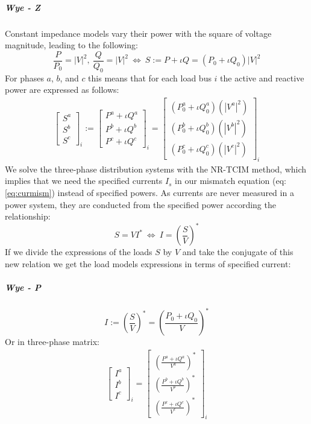 \documentclass[10pt,journal]{article}
\begin{document}
\subparagraph{Wye - Z}
Constant impedance models vary their power with the square of voltage magnitude, leading to the following: 
\begin{equation}
    \frac{P}{P_0}=|V|^2,\ \frac{Q}{Q_0}=|V|^2\ \Leftrightarrow\ S := P +\iota Q = (P_0 + \iota Q_0)|V|^2
\end{equation}
For phases $a$, $b$, and $c$ this means that for each load bus $i$ the active and reactive power are expressed as follows: 
\begin{align}
    \begin{bmatrix}
    S^a\\
    S^b\\
    S^c
    \end{bmatrix}_i := \begin{bmatrix}
    P^a +\iota Q^a\\
    P^b +\iota Q^b\\
    P^c +\iota Q^c
    \end{bmatrix}_i = \begin{bmatrix}
    (P^a_0 +\iota Q^a_0)(|V^a|^2)\\
    (P^b_0 +\iota Q^b_0)(|V^b|^2)\\
    (P^c_0 +\iota Q^c_0)(|V^c|^2)
    \end{bmatrix}_i 
\end{align}
We solve the three-phase distribution systems with the NR-TCIM method, which implies that we need the specified currents $I_s$ in our mismatch equation (eq: \ref{eq:curmism}) instead of specified powers. As currents are never measured in a power system, they are conducted from the specified power according the relationship: 
\begin{equation}
    S=VI^*\ \Leftrightarrow\ I = (\frac{S}{V})^*
\end{equation}
If we divide the expressions of the loads $S$ by $V$ and take the conjugate of this new relation we get the load models expressions in terms of specified current:
\subparagraph{Wye - P }
\begin{equation}
    I := (\frac{S}{V})^* = (\frac{P_0+\iota Q_0}{V})^*
\end{equation}
Or in three-phase matrix: 
\begin{align}
\begin{bmatrix}
    I^a\\
    I^b\\
    I^c
    \end{bmatrix}_i = \begin{bmatrix}
   (\frac{ P^a +\iota Q^a}{V^a})^*\\
    (\frac{ P^b +\iota Q^b}{V^b})^*\\
    (\frac{ P^c +\iota Q^c}{V^c})^*
    \end{bmatrix}_i 
    \end{align}
\end{document}
